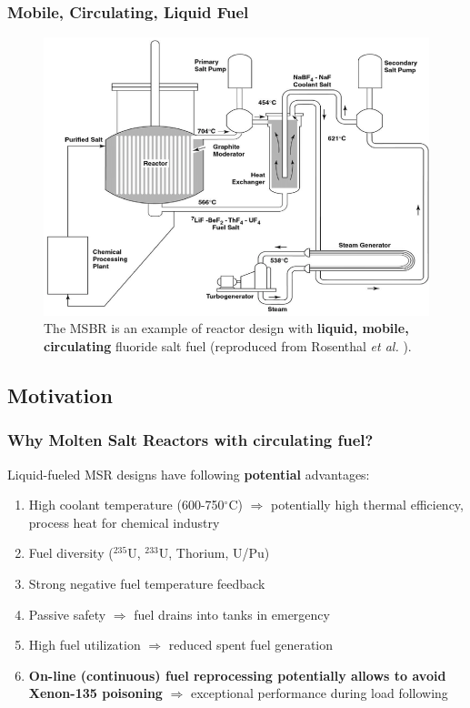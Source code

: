 \begin{frame} %
\frametitle{Mobile, Circulating, Liquid Fuel}
\vspace{-2mm}
\begin{figure}[t]
      \includegraphics[height=0.6\textwidth]{./images/msbr_scheme.png}
	\caption{The \gls{MSBR} is an example of reactor design with 
	\textbf{liquid, mobile, circulating} fluoride salt fuel 
	(reproduced from Rosenthal \emph{et al.} 
	\cite{rosenthal_molten-salt_1970}).}
\end{figure}   

\end{frame}


\subsection{Motivation}

\begin{frame}
\frametitle{Why Molten Salt Reactors with circulating fuel?}
\begin{block}{Liquid-fueled \gls{MSR} designs have following \textbf{potential} advantages:}
	\begin{enumerate}
		\itemsep1em
		\item High coolant temperature (600-750$^{\circ}$C) 
		$\Rightarrow$ potentially high thermal efficiency, process 
		heat for chemical industry
		\item Fuel diversity ($^{235}$U, $^{233}$U, Thorium, U/Pu)
		\item Strong negative fuel temperature feedback 
		\item Passive safety $\Rightarrow$ fuel drains into tanks 
		in emergency
		\item High fuel utilization $\Rightarrow$ reduced spent fuel 
		generation
		\item<2> \textbf{On-line (continuous) fuel reprocessing potentially  
		allows to avoid Xenon-135 poisoning} $\Rightarrow$ exceptional 
		performance during load following
	\end{enumerate}
\end{block}

\end{frame}

